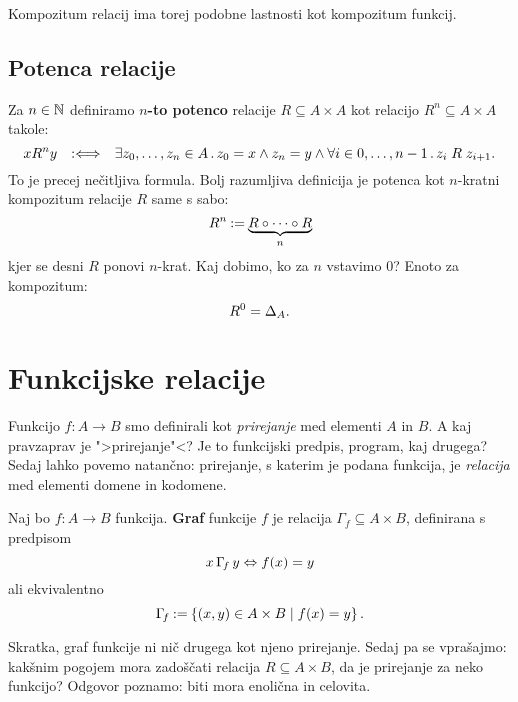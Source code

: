 Kompozitum relacij ima torej podobne lastnosti kot kompozitum funkcij.

\subsection{Potenca relacije}

Za $n \in \NN$ definiramo \textbf{$n$-to potenco} relacije $R \subseteq A \times A$ kot relacijo $R^n \subseteq A \times A$ takole:
%
\begin{equation*}
    x R^n y \defiff
    \some{z_0, \ldots, z_n \in A}
    z_0 = x \land z_n = y \land \all{i \in {0, \ldots, n-1}} z_i \rel{R} z_{i+1}.
\end{equation*}
%
To je precej nečitljiva formula. Bolj razumljiva definicija je potenca kot $n$-kratni kompozitum relacije $R$ same s sabo:
%
\begin{equation*}
    R^n \defeq \underbrace{R \circ \cdots \circ R}_n
\end{equation*}
%
kjer se desni $R$ ponovi $n$-krat. Kaj dobimo, ko za $n$ vstavimo $0$? Enoto za kompozitum:
%
\begin{equation*}
    R^0 = \diag[A].
\end{equation*}

\section{Funkcijske relacije}

Funkcijo $f : A \to B$ smo definirali kot \emph{prirejanje} med elementi $A$ in $B$. A
kaj pravzaprav je ">prirejanje"<? Je to funkcijski predpis, program, kaj drugega?
Sedaj lahko povemo natančno: prirejanje, s katerim je podana funkcija, je
\emph{relacija} med elementi domene in kodomene.

\begin{definicija}
  Naj bo $f : A \to B$ funkcija. \textbf{Graf} funkcije $f$ je relacija
  $\Gamma_f \subseteq A \times B$, definirana s predpisom
  \begin{equation*}
    x \,\Gamma_{\!f}\, y \liff f(x) = y
  \end{equation*}
  ali ekvivalentno
  \begin{equation*}
    \Gamma_{\!f} \defeq \set{ (x, y) \in A \times B \such f(x) = y }.
  \end{equation*}
\end{definicija}

Skratka, graf funkcije ni nič drugega kot njeno prirejanje.
%
Sedaj pa se vprašajmo: kakšnim pogojem mora zadoščati relacija $R \subseteq A \times B$, da je prirejanje za neko funkcijo? Odgovor poznamo: biti mora enolična in celovita.

